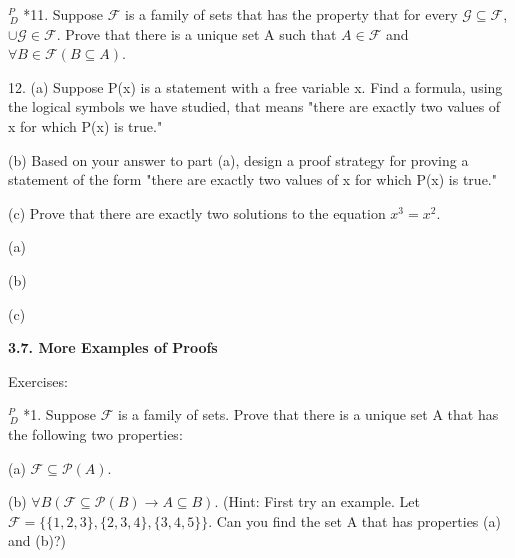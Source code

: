 \documentclass{article}
\begin{document}
$^{\textit{P}}_{\, \textit{D}}$ *11. Suppose $\mathcal{F}$ is a family of sets that has the property that for every $\mathcal{G} \subseteq \mathcal{F}$, $\cup \mathcal{G} \in \mathcal{F}$. Prove that there is a unique set A such that $A \in \mathcal{F}$ and $\forall B \in \mathcal{F}(B \subseteq A)$.


\vspace{30pt}



\vspace{30pt}

\hspace{12pt}12. (a) Suppose P(x) is a statement with a free variable x. Find a formula,
using the logical symbols we have studied, that means "there are
exactly two values of x for which P(x) is true."

\hspace{12pt}(b) Based on your answer to part (a), design a proof strategy for proving
a statement of the form "there are exactly two values of x for which
P(x) is true."

\hspace{12pt}(c) Prove that there are exactly two solutions to the equation $x^3 = x^2$.

(a)

\vspace{30pt}

(b)

\vspace{30pt}

(c)

\vspace{50pt}

\textbf{3.7. More Examples of Proofs}

Exercises:


\vspace{30pt}


\vspace{30pt}

$^{\textit{P}}_{\, \textit{D}}$ *1. Suppose $\mathcal{F}$ is a family of sets. Prove that there is a unique set A that has the following two properties:

\hspace{12pt}(a) $\mathcal{F} \subseteq \mathcal{P} (A)$.

\hspace{12pt}(b) $\forall B(\mathcal{F} \subseteq \mathcal{P} (B) \to A \subseteq B)$.
(Hint: First try an example. Let $\mathcal{F} = \{\{1, 2, 3\},\{2, 3, 4\},\{3, 4, 5\}\}$. Can
you find the set A that has properties (a) and (b)?)
\end{document}
